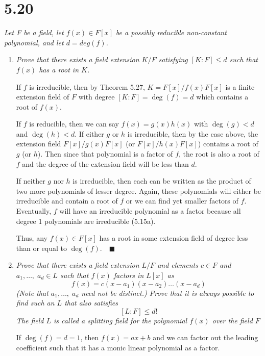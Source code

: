 \documentclass[12pt]{article}
\newcommand{\qed}{\quad \blacksquare}
\begin{document}
\section*{5.20}
\emph{Let F be a field, let $f(x) \in F[x]$ be a possibly reducible non-constant polynomial, and let $d = deg(f)$.}
\begin{enumerate}[label=(\alph*)]
    \item \emph{Prove that there exists a field extension $K / F$ satisfying $[K : F] \leq d$ such that $f(x)$ has a root in $K$.}
    
        \color{blue}
            If $f$ is irreducible, then by Theorem 5.27, $K = F[x]/f(x)F[x]$ is a finite extension field of $F$ with degree $[K: F] = \deg(f) = d$ which contains a root of $f(x)$. 

            If $f$ is reducible, then we can say $f(x) = g(x)h(x)$ with $\deg(g) < d$ and $\deg(h) < d$. If either $g$ or $h$ is irreducible, then by the case above, the extension field $F[x]/g(x)F[x]$ (or $F[x]/h(x)F[x]$) contains a root of $g$ (or $h$). Then since that polynomial is a factor of $f$, the root is also a root of $f$ and the degree of the extension field will be less than $d$. 

            If neither $g$ nor $h$ is irreducible, then each can be written as the product of two more polynomials of lesser degree. Again, these polynomials will either be irreducible and contain a root of $f$ or we can find yet smaller factors of $f$. Eventually, $f$ will have an irreducible polynomial as a factor because all degree 1 polynomials are irreducible (5.15a). 

            Thus, any $f(x) \in F[x]$ has a root in some extension field of degree less than or equal to $\deg(f). \qed$
        \color{black}
    
    \item \emph{Prove that there exists a field extension $L/ F$ and elements $c \in F$ and $a_1, \dots,\; a_d \in L$ such that $f(x)$ factors in $L[x]$ as}
    \[f(x) = c(x - a_1)(x - a_2) \dots (x - a_d)\]
    \emph{ (Note that $a_1, \dots,\; a_d$ need not be distinct.) Prove that it is always possible to find such an $L$ that also satisfies}
    \[[L : F] \leq d!\]
    \emph{The field $L$ is called a splitting field for the polynomial $f(x)$ over the field $F$}

        \color{blue}
            If $\deg(f) = d = 1$, then $f(x) = ax + b$ and we can factor out the leading coefficient such that it has a monic linear polynomial as a factor. 


\end{enumerate}
\end{document}
